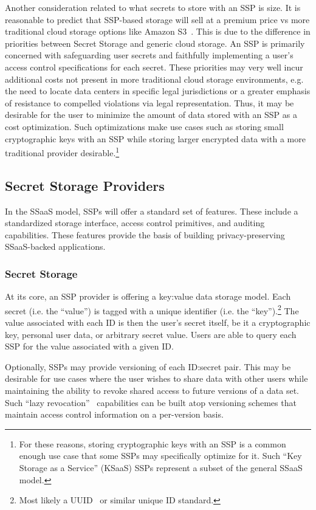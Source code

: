Another consideration related to what secrets to store with an SSP is
size. It is reasonable to predict that SSP-based storage will sell at
a premium price vs more traditional cloud storage options like Amazon
S3~\cite{amazon-s3}. This is due to the difference in priorities
between Secret Storage and generic cloud storage. An SSP is primarily
concerned with safeguarding user secrets and faithfully implementing a
user's access control specifications for each secret. These priorities
may very well incur additional costs not present in more traditional
cloud storage environments, e.g. the need to locate data centers in
specific legal jurisdictions or a greater emphasis of resistance to
compelled violations via legal representation. Thus, it may be
desirable for the user to minimize the amount of data stored with an
SSP as a cost optimization. Such optimizations make use cases such as
storing small cryptographic keys with an SSP while storing larger
encrypted data with a more traditional provider
desirable.\footnote{For these reasons, storing cryptographic keys with
  an SSP is a common enough use case that some SSPs may specifically
  optimize for it. Such ``Key Storage as a Service'' (KSaaS) SSPs
  represent a subset of the general SSaaS model.}

\subsection{Secret Storage Providers}

In the SSaaS model, SSPs will offer a standard set of features. These
include a standardized storage interface, access control primitives,
and auditing capabilities. These features provide the basis of
building privacy-preserving SSaaS-backed applications.

\subsubsection{Secret Storage}

At its core, an SSP provider is offering a key:value data storage
model. Each secret (i.e. the ``value'') is tagged with a unique
identifier (i.e. the ``key'').\footnote{Most likely a
  UUID~\cite{leach2005} or similar unique ID standard.} The value
associated with each ID is then the user's secret itself, be it a
cryptographic key, personal user data, or arbitrary secret
value. Users are able to query each SSP for the value associated with
a given ID.

Optionally, SSPs may provide versioning of each ID:secret pair. This
may be desirable for use cases where the user wishes to share data
with other users while maintaining the ability to revoke shared access
to future versions of a data set. Such ``lazy
revocation''~\cite{kallahalla2003} capabilities can be built atop
versioning schemes that maintain access control information on a
per-version basis.

